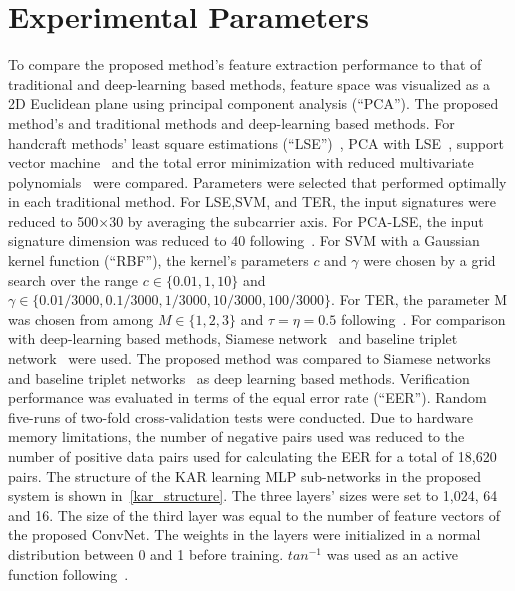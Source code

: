 \section{Experimental Parameters}
To compare the proposed method's feature extraction performance to that of traditional and deep-learning based methods, feature space was visualized as a 2D Euclidean plane using principal component analysis (``PCA''). 
The proposed method's and traditional methods and deep-learning based methods.
For handcraft methods' least square estimations (``LSE'')~\cite{duda2012pattern}, PCA with LSE~\cite{turk1991eigenfaces}, support vector machine~\cite{vapnik2013nature} and the total error minimization with reduced multivariate polynomials~\cite{toh2003fingerprint,toh2008between} were compared. Parameters were selected that performed optimally in each traditional method. For LSE,SVM, and TER, the input signatures were reduced to 500$\times$30 by averaging the subcarrier axis. For PCA-LSE, the input signature dimension was reduced to 40 following~\cite{moon2017air}. For SVM with a Gaussian kernel function (``RBF''), the kernel's parameters $c$ and $\gamma$ were chosen by a grid search over the range $c\in\{0.01,1,10\}$ and $\gamma\in\{0.01/3000, 0.1/3000, 1/3000, 10/3000, 100/3000\}$. For TER, the parameter M was chosen from among $M\in\{1,2,3\}$ and $\tau=\eta=0.5$ following~\cite{toh2008between}.
For comparison with deep-learning based methods, Siamese network~\cite{koch2015siamese} and baseline triplet network~\cite{hoffer2015deep} were used.
The proposed method was compared to Siamese networks~\cite{koch2015siamese} and baseline triplet networks~\cite{hoffer2015deep} as deep learning based methods.
Verification performance was evaluated in terms of the equal error rate (``EER''). Random five-runs of two-fold cross-validation tests were conducted.
Due to hardware memory limitations, the number of negative pairs used was reduced to the number of positive data pairs used for calculating the EER for a total of 18,620 pairs.
The structure of the KAR learning MLP sub-networks in the proposed system is shown in~\ref{kar_structure}. The three layers' sizes were set to 1,024, 64 and 16. The size of the third layer was equal to the number of feature vectors of the proposed ConvNet. The weights in the layers were initialized in a normal distribution between 0 and 1 before training.
$tan^{-1}$ was used as an active function following~\cite{toh2018analytic}.
